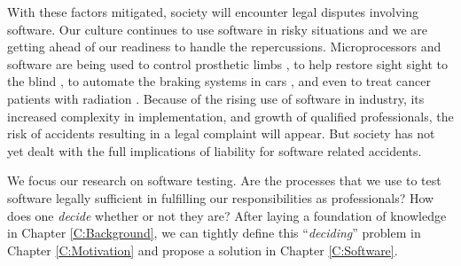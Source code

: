 With these factors mitigated, society will encounter legal disputes involving
software. Our culture continues to use software in risky situations and we are
getting ahead of our readiness to handle the repercussions. Microprocessors
and software are being used to control prosthetic limbs \cite{Graupe78}, to help
restore sight sight to the blind \cite{Fox95}, to automate the braking systems
in cars \cite{Hurtig94}, and even to treat cancer patients with radiation
\cite{Leveson93}. Because of the rising use of software in industry, its
increased complexity in implementation, and growth of qualified professionals,
the risk of accidents resulting in a legal complaint will appear. But society
has not yet dealt with the full implications of liability for software related
accidents.

We focus our research on software testing. Are the processes that we use to test
software legally sufficient in fulfilling our responsibilities as professionals?
How does one \textit{decide} whether or not they are? After laying a foundation
of knowledge in Chapter \ref{C:Background}, we can tightly define this 
``\textit{deciding}'' problem in Chapter \ref{C:Motivation} and propose a solution
in Chapter \ref{C:Software}.


